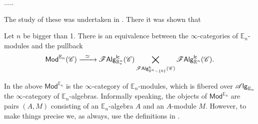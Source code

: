 \documentclass[../text]{subfiles}
\begin{document}


.....

The study of these was undertaken in \cite{ginot2015}. There it was shown that

\begin{theorem}\label{thm:ginot_classif_Rn*}
    Let $n$ be bigger than 1. There is an equivalence between the $\infty$-categories of $\mathbb{E}_n$-modules and the pullback
    \begin{equation}
        \mathsf{Mod}^{\mathbb{E}_n} (\mathscr{C}) \xrightarrow{\ \ \simeq \ \ } \mathscr{F} \mathsf{Alg}^{\mathsf{lc}}_{\mathbb{R}^n_*} (\mathscr{C}) \bigtimes_{\mathscr{F} \mathsf{Alg}^{\mathsf{lc}}_{\mathbb{R}^n \smallsetminus \{ 0\} } (\mathscr{C})} \mathscr{F} \mathsf{Alg}^{\mathsf{lc}}_{\mathbb{R}^n} (\mathscr{C}).
    \end{equation}
\end{theorem}

\begin{remark}
    In the above $\mathsf{Mod}^{\mathbb{E}_n}$ is the $\infty$-category of $\mathbb{E}_n$-modules, which is fibered over $\mathscr{A} \mathsf{lg}_{\mathbb{E}_n}$ the $\infty$-category of $\mathbb{E}_n$-algebras. Informally speaking, the objects of $\mathsf{Mod}^{\mathbb{E}_n}$ are pairs $(A, M)$ consisting of an $\mathbb{E}_n$-algebra $A$ and an $A$-module $M$. However, to make things precise we, as always, use the definitions in \cite[ch.3]{lurie_ha}.
\end{remark}
\end{document}

